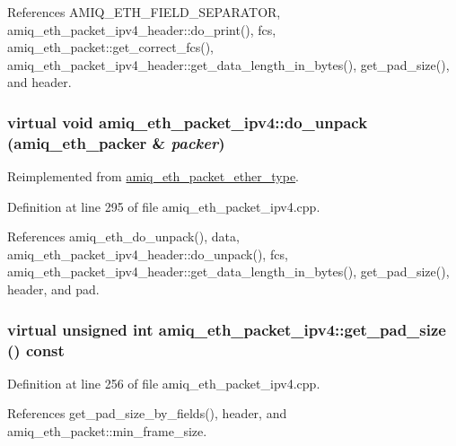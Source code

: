 References AMIQ\_\-ETH\_\-FIELD\_\-SEPARATOR, amiq\_\-eth\_\-packet\_\-ipv4\_\-header::do\_\-print(), fcs, amiq\_\-eth\_\-packet::get\_\-correct\_\-fcs(), amiq\_\-eth\_\-packet\_\-ipv4\_\-header::get\_\-data\_\-length\_\-in\_\-bytes(), get\_\-pad\_\-size(), and header.\hypertarget{classamiq__eth__packet__ipv4_af85e08566b37953edee4566c40400f05}{
\subsubsection[{do\_\-unpack}]{\setlength{\rightskip}{0pt plus 5cm}virtual void amiq\_\-eth\_\-packet\_\-ipv4::do\_\-unpack ({\bf amiq\_\-eth\_\-packer} \& {\em packer})}}
\label{classamiq__eth__packet__ipv4_af85e08566b37953edee4566c40400f05}


Reimplemented from \hyperlink{classamiq__eth__packet__ether__type_a0c86ef80c46bbed384739b23e5efb0ef}{amiq\_\-eth\_\-packet\_\-ether\_\-type}.

Definition at line 295 of file amiq\_\-eth\_\-packet\_\-ipv4.cpp.

References amiq\_\-eth\_\-do\_\-unpack(), data, amiq\_\-eth\_\-packet\_\-ipv4\_\-header::do\_\-unpack(), fcs, amiq\_\-eth\_\-packet\_\-ipv4\_\-header::get\_\-data\_\-length\_\-in\_\-bytes(), get\_\-pad\_\-size(), header, and pad.\hypertarget{classamiq__eth__packet__ipv4_ae2b9fabf7983bced45ccfe392d0c1e95}{
\subsubsection[{get\_\-pad\_\-size}]{\setlength{\rightskip}{0pt plus 5cm}virtual unsigned int amiq\_\-eth\_\-packet\_\-ipv4::get\_\-pad\_\-size () const}}
\label{classamiq__eth__packet__ipv4_ae2b9fabf7983bced45ccfe392d0c1e95}


Definition at line 256 of file amiq\_\-eth\_\-packet\_\-ipv4.cpp.

References get\_\-pad\_\-size\_\-by\_\-fields(), header, and amiq\_\-eth\_\-packet::min\_\-frame\_\-size.

